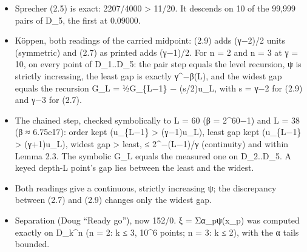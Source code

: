 \begin{enumerate}
\begin{itemize}
\item Sprecher (2.5) is exact: 2207/4000 > 11/20. It descends on 10 of the 99,999 pairs of D\_\allowbreak{}5, the first at 0.09000.
\item Köppen, both readings of the carried midpoint: (2.9) adds (γ−2)/2 units (symmetric) and (2.7) as printed adds (γ−1)/2. For n = 2 and n = 3 at γ = 10, on every point of D\_\allowbreak{}1..D\_\allowbreak{}5: the pair step equals the level recursion, ψ is strictly increasing, the least gap is exactly γ\textasciicircum{}−β(L), and the widest gap equals the recursion G\_\allowbreak{}L = ½G\_\allowbreak{}\{L−1\} − (s/2)u\_\allowbreak{}L, with s = γ−2 for (2.9) and γ−3 for (2.7).
\item The chained step, checked symbolically to L = 60 (β = 2\textasciicircum{}60−1) and L = 38 (β ≈ 6.75e17): order kept (u\_\allowbreak{}\{L−1\} > (γ−1)u\_\allowbreak{}L), least gap kept (u\_\allowbreak{}\{L−1\} > (γ+1)u\_\allowbreak{}L), widest gap > least, ≤ 2\textasciicircum{}−(L−1)/γ (continuity) and within Lemma 2.3. The symbolic G\_\allowbreak{}L equals the measured one on D\_\allowbreak{}2..D\_\allowbreak{}5. A keyed depth-L point's gap lies between the least and the widest.
\item Both readings give a continuous, strictly increasing ψ; the discrepancy between (2.7) and (2.9) changes only the widest gap.
\item Separation (Doug “Ready go”), now 152/0. ξ = Σα\_\allowbreak{}pψ(x\_\allowbreak{}p) was computed exactly on D\_\allowbreak{}k\textasciicircum{}n (n = 2: k ≤ 3, 10\textasciicircum{}6 points; n = 3: k ≤ 2), with the α tails bounded.


\end{itemize}
\end{enumerate}
